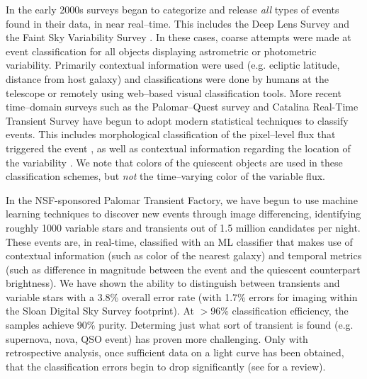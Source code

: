 
In the early 2000s surveys began to categorize and release {\it all} types of
events found in their data, in near real--time. This includes the Deep Lens
Survey \citep{Becker04a} and the Faint Sky Variability Survey
\citep{2003MNRAS.339..427G}.  In these cases, coarse attempts were made at event
classification for all objects displaying astrometric or photometric
variability. Primarily contextual information were used (e.g. ecliptic latitude,
distance from host galaxy) and classifications were done by humans at the
telescope or remotely using web--based visual classification tools.  More recent
time--domain surveys such as the Palomar--Quest survey
\citep{2008AN....329..263D} and Catalina Real-Time Transient Survey
\citep{2011arXiv1102.5004D} have begun to adopt modern statistical techniques to
classify events.  This includes morphological classification of the pixel--level
flux that triggered the event \citep{2008AIPC.1082..252D}, as well as contextual
information regarding the location of the variability
\citep{2010ASPC..434..115M}.  We note that colors of the quiescent objects are
used in these classification schemes, but {\it not} the time--varying color of
the variable flux.

In the NSF-sponsored Palomar Transient Factory, we have begun to use machine learning techniques to discover new events through image differencing, identifying roughly 1000 variable stars and transients out of 1.5 million candidates per night. These events are, in real-time, classified with an ML classifier that makes use of contextual information (such as color of the nearest galaxy) and temporal metrics (such as difference in magnitude between the event and the quiescent counterpart brightness). We have shown \citep{bloom}  the ability to  distinguish between transients and variable stars with a 3.8\% overall error rate (with 1.7\% errors for imaging within the Sloan Digital Sky Survey footprint). At $>$96\% classification efficiency, the samples achieve 90\% purity. Determing just what sort of transient is found (e.g. supernova, nova, QSO event) has proven more challenging. Only with retrospective analysis, once sufficient data on a light curve has been obtained, that the classification errors begin to drop significantly \citep{rs} (see \citealt{rb} for a review).



